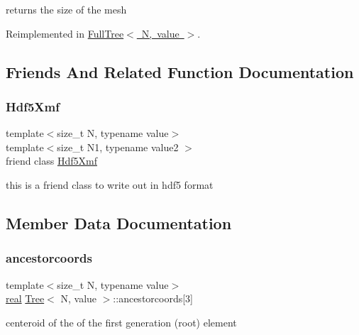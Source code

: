 returns the size of the mesh 

Reimplemented in \mbox{\hyperlink{classFullTree_a13bb6b68dea0e36255dbd7b057110806}{Full\+Tree$<$ N, value $>$}}.



\subsection{Friends And Related Function Documentation}
\mbox{\label{classTree_ab87a301be23011123f58ee948a55b2d9}} 
\subsubsection{\texorpdfstring{Hdf5\+Xmf}{Hdf5Xmf}}
{\footnotesize\ttfamily template$<$size\+\_\+t N, typename value$>$ \\
template$<$size\+\_\+t N1, typename value2 $>$ \\
friend class \mbox{\hyperlink{classHdf5Xmf}{Hdf5\+Xmf}}\hspace{0.3cm}{\ttfamily [friend]}}

this is a friend class to write out in hdf5 format 

\subsection{Member Data Documentation}
\mbox{\label{classTree_a2199b0f2221e9bac89bbf57ac1fef24e}} 
\subsubsection{\texorpdfstring{ancestorcoords}{ancestorcoords}}
{\footnotesize\ttfamily template$<$size\+\_\+t N, typename value$>$ \\
\mbox{\hyperlink{definitions_8h_aedc0ad84d1e764530814f57ad931d02a}{real}} \mbox{\hyperlink{classTree}{Tree}}$<$ N, value $>$\+::ancestorcoords\mbox{[}3\mbox{]}\hspace{0.3cm}{\ttfamily [protected]}}

centeroid of the of the first generation (root) element \mbox{\label{classTree_a8b6e0e406bcbfc2b8e1598cfc967e6c8}} 
